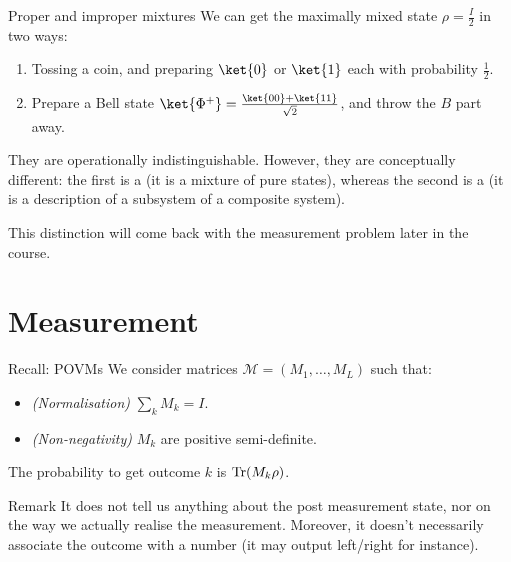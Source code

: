 \documentclass[a4paper]{article}
\begin{document}
\begin{parag}{Proper and improper mixtures}
    We can get the maximally mixed state $\rho = \frac{I}{2}$ in two ways:
    \begin{enumerate}
        \item Tossing a coin, and preparing $\ket{0}$ or $\ket{1}$ each with probability $\frac{1}{2}$.
        \item Prepare a Bell state $\ket{\Phi^+} = \frac{\ket{00} + \ket{11}}{\sqrt{2}}$, and throw the $B$ part away.
    \end{enumerate}

    They are operationally indistinguishable. However, they are conceptually different: the first is a  (it is a mixture of pure states), whereas the second is a  (it is a description of a subsystem of a composite system).

    This distinction will come back with the measurement problem later in the course.
\end{parag}

\section{Measurement}

\begin{parag}{Recall: POVMs}
    We consider matrices $\mathcal{M} = \left(M_1, \ldots, M_L\right)$ such that: 
    \begin{itemize}
        \item \textit{(Normalisation)} $\sum_{k} M_k = I$.
        \item \textit{(Non-negativity)} $M_k$ are positive semi-definite.
    \end{itemize}

    The probability to get outcome $k$ is $\Tr\left(M_k \rho\right)$.

    \begin{subparag}{Remark}
        It does not tell us anything about the post measurement state, nor on the way we actually realise the measurement. Moreover, it doesn't necessarily associate the outcome with a number (it may output left/right for instance).
    \end{subparag}
\end{parag}
\end{document}
